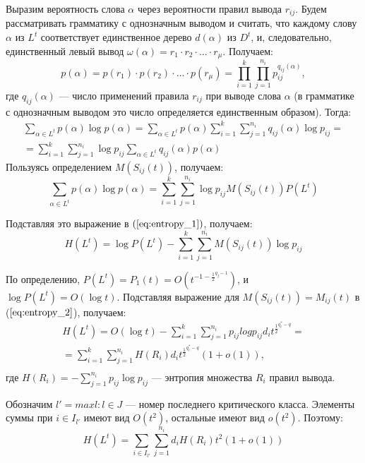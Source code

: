 \documentclass[12pt]{article}
\begin{document}
Выразим вероятность слова $\alpha$ через вероятности правил вывода $r_{ij}$. Будем рассматривать грамматику с однозначным выводом и считать, что каждому слову $\alpha$ из $L^t$ соответствует единственное дерево $d(\alpha)$ из $D^t$, и, следовательно, единственный левый вывод $\omega(\alpha) = r_1 \cdot r_2 \cdot \ldots \cdot r_\mu$. Получаем:
\begin{equation}
	p(\alpha) = p(r_1) \cdot p(r_2) \cdot \ldots \cdot p(r_\mu) = \prod_{i = 1}^k \prod_{j = 1}^{n_i} p_{ij}^{q_{ij}(\alpha)},
\end{equation}
где $q_{ij}(\alpha)$ --- число применений правила $r_{ij}$ при выводе слова $\alpha$ (в грамматике с однозначным выводом это число определяется единственным образом). Тогда:
\begin{multline}
	\sum_{\alpha \in L^t} p(\alpha) \log p(\alpha) = \sum_{\alpha \in L^t} p(\alpha) \sum_{i = 1}^k \sum_{j = 1}^{n_i} q_{ij}(\alpha) \log p_{ij} = \\
	= \sum_{i = 1}^k \sum_{j = 1}^{n_i} \log p_{ij} \sum_{\alpha \in L^t} q_{ij}(\alpha) p(\alpha)
\end{multline}
Пользуясь определением $M(S_{ij}(t))$, получаем:
\begin{equation}
	\sum_{\alpha \in L^t} p(\alpha) \log p(\alpha) = \sum_{i = 1}^k \sum_{j = 1}^{n_i} \log p_{ij} M(S_{ij}(t)) P(L^t)
\end{equation}

Подставляя это выражение в $(\ref{eq:entropy_1})$, получаем:
\begin{equation}
\label{eq:entropy_2}
	H(L^t) = \log P(L^t) - \sum_{i = 1}^k \sum_{j = 1}^{n_i} M(S_{ij}(t)) \log p_{ij}
\end{equation}

По определению, $P(L^t) = P_1(t) = O(t^{-1 - \frac{1}{2}^{q_j - 1}})$, и $\log P(L^t) = O(\log t)$. Подставляя выражение для $M(S_{ij}(t)) = M_{ij}(t)$ в ($\ref{eq:entropy_2}$), получаем:
\begin{multline}
	H(L^t) = O(\log t) - \sum_{i = 1}^k \sum_{j = 1}^{n_i} p_{ij} log p_{ij} d_i t^{\frac{1}{2}^{q^*_l - q}} = \\
	= \sum_{i = 1}^k \sum_{j = 1}^{n_i} H(R_i) d_i t^{\frac{1}{2}^{q^*_l - q}} (1 + o(1)), \\
\end{multline}
где $H(R_i) = - \sum_{j = 1}^{n_i} p_{ij} \log p_{ij}$ --- энтропия множества $R_i$ правил вывода.

Обозначим $l' = max{l : l \in J}$ --- номер последнего критического класса. Элементы суммы при $i \in I_{l'}$ имеют вид $O(t^2)$, остальные имеют вид $o(t^2)$. Поэтому:
\begin{equation}
	H(L^t) = \sum_{i \in I_{l'}} \sum_{j = 1}^{n_i} d_i H(R_i) t^2 (1 + o(1))
\end{equation}
\end{document}
